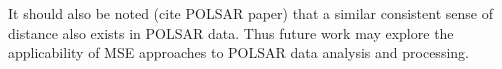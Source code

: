 \documentclass[journal]{IEEEtran}
\begin{document}
It should also be noted (cite POLSAR paper) that a similar consistent sense of distance also exists in POLSAR data. 
Thus future work may explore the applicability of MSE approaches to POLSAR data analysis and processing.









\end{document}
